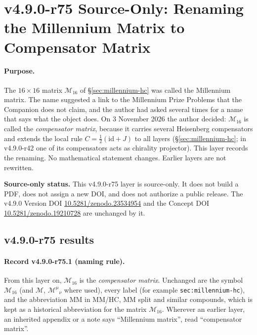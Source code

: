
\clearpage
\section*{v4.9.0-r75 Source-Only: Renaming the Millennium Matrix to Compensator Matrix}
\label{sec:v490-r75-compensator-matrix}

\paragraph{Purpose.}
The \(16\times16\) matrix \(\mathcal M_{16}\) of \S\ref{sec:millennium-hc} was called the Millennium matrix.  The name suggested
a link to the Millennium Prize Problems that the Companion does not claim, and the author had asked several times for a name
that says what the object does.  On 3 November 2026 the author decided: \(\mathcal M_{16}\) is called the \emph{compensator
matrix}, because it carries several Heisenberg compensators and extends the local rule \(C=\tfrac12(\mathrm{id}+J)\) to all
layers (\S\ref{sec:millennium-hc}; in v4.9.0-r42 one of its compensators acts as chirality projector).  This layer records the
renaming.  No mathematical statement changes.  Earlier layers are not rewritten.

\noindent\textbf{Source-only status.}
This v4.9.0-r75 layer is source-only.  It does not build a PDF, does not assign a new DOI,
and does not authorize a public release.  The v4.9.0 Version DOI
\href{https://doi.org/10.5281/zenodo.23534954}{10.5281/zenodo.23534954} and the Concept DOI
\href{https://doi.org/10.5281/zenodo.19210728}{10.5281/zenodo.19210728} are unchanged by it.

\subsection*{v4.9.0-r75 results}
\label{subsec:v490-r75-results}

\paragraph{Record v4.9.0-r75.1 (naming rule).}
From this layer on, \(\mathcal M_{16}\) is the \emph{compensator matrix}.  Unchanged are the symbol \(\mathcal M_{16}\) (and
\(\mathcal M\), \(\mathcal M^\mu{}_\nu\) where used), every label (for example \texttt{sec:millennium-hc}), and the
abbreviation MM in MM/HC, MM split and similar compounds, which is kept as a historical abbreviation for the matrix
\(\mathcal M_{16}\).  Wherever an earlier layer, an inherited appendix or a note says ``Millennium matrix'', read
``compensator matrix''.

